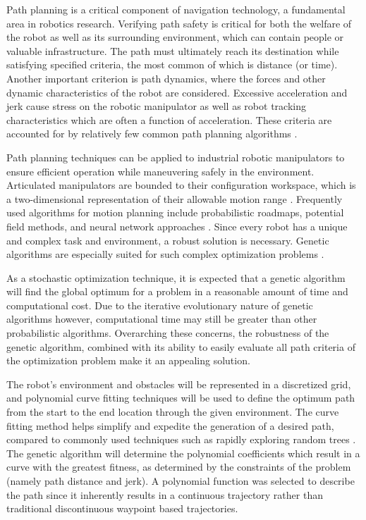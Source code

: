 
Path planning is a critical component of navigation technology, a fundamental area in robotics research. Verifying path safety is critical for both the welfare of the robot as well as its surrounding environment, which can contain people or valuable infrastructure. The path must ultimately reach its destination while satisfying specified criteria, the most common of which is distance (or time). Another important criterion is path dynamics, where the forces and other dynamic characteristics of the robot are considered. Excessive acceleration and jerk cause stress on the robotic manipulator as well as robot tracking characteristics which are often a function of acceleration. These criteria are accounted for by relatively few common path planning algorithms \cite{elshamli04}.

Path planning techniques can be applied to industrial robotic manipulators to ensure efficient operation while maneuvering safely in the environment. Articulated manipulators are bounded to their configuration workspace, which is a two-dimensional representation of their allowable motion range \cite{kavraki96}. Frequently used algorithms for motion planning include probabilistic roadmaps, potential field methods, and neural network approaches \cite{sharir89,khosla88,rimon92,yang00}. Since every robot has a unique and complex task and environment, a robust solution is necessary. Genetic algorithms are especially suited for such complex optimization problems \cite{renner03}.

As a stochastic optimization technique, it is expected that a genetic algorithm will find the global optimum for a problem in a reasonable amount of time and computational cost. Due to the iterative evolutionary nature of genetic algorithms however, computational time may still be greater than other probabilistic algorithms. Overarching these concerns, the robustness of the genetic algorithm, combined with its ability to easily evaluate all path criteria of the optimization problem make it an appealing solution.

The robot's environment and obstacles will be represented in a discretized grid, and polynomial curve fitting techniques will be used to define the optimum path from the start to the end location through the given environment. The curve fitting method helps simplify and expedite the generation of a desired path, compared to commonly used techniques such as rapidly exploring random trees \cite{rodriguez06}. The genetic algorithm will determine the polynomial coefficients which result in a curve with the greatest fitness, as determined by the constraints of the problem (namely path distance and jerk). A polynomial function was selected to describe the path since it inherently results in a continuous trajectory rather than traditional discontinuous waypoint based trajectories. 

